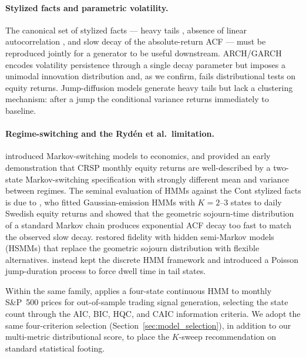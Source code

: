 \paragraph{Stylized facts and parametric volatility.}
The canonical set of stylized facts \cite{cont2001empirical} — heavy tails \cite{mandelbrot1963variation}, absence of linear autocorrelation \cite{fama1970efficient}, and slow decay of the absolute-return ACF \cite{schwert1989does} — must be reproduced jointly for a generator to be useful downstream.
ARCH/GARCH \cite{engle1982autoregressive, bollerslev1986generalized} encodes volatility persistence through a single decay parameter but imposes a unimodal innovation distribution and, as we confirm, fails distributional tests on equity returns.
Jump-diffusion models \cite{merton1976option, kou2002jump} generate heavy tails but lack a clustering mechanism: after a jump the conditional variance returns immediately to baseline.

\paragraph{Regime-switching and the Ryd\'{e}n et al.\ limitation.}
\citet{hamilton1989new} introduced Markov-switching models to economics, and \citet{schaller1997regime} provided an early demonstration that CRSP monthly equity returns are well-described by a two-state Markov-switching specification with strongly different mean and variance between regimes.
The seminal evaluation of HMMs against the Cont stylized facts is due to \citet{ryden1998stylized}, who fitted Gaussian-emission HMMs with $K = 2$--$3$ states to daily Swedish equity returns and showed that the geometric sojourn-time distribution of a standard Markov chain produces exponential ACF decay too fast to match the observed slow decay.
\citet{bulla2006stylized} restored fidelity with hidden semi-Markov models (HSMMs) that replace the geometric sojourn distribution with flexible alternatives.
\citet{alswaidan2026hybrid} instead kept the discrete HMM framework and introduced a Poisson jump-duration process to force dwell time in tail states.

Within the same family, \citet{nguyen2018hidden} applies a four-state continuous HMM to monthly S\&P~500 prices for out-of-sample trading signal generation, selecting the state count through the AIC, BIC, HQC, and CAIC information criteria.
We adopt the same four-criterion selection (Section~\ref{sec:model_selection}), in addition to our multi-metric distributional score, to place the $K$-sweep recommendation on standard statistical footing.

